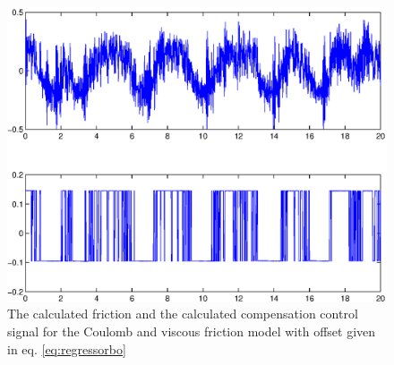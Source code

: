 \documentclass[10pt,a4paper]{article}
\begin{document}
\begin{figure}[H]
\centering
\includegraphics[width=1\textwidth]{plots/vlufviscoffsetbest.eps}
\caption{The calculated friction and the calculated compensation control signal for the Coulomb and viscous friction model with offset given in eq. \ref{eq:regressorbo}}
\label{fig:VLUFoffset}
\end{figure}
\end{document}
